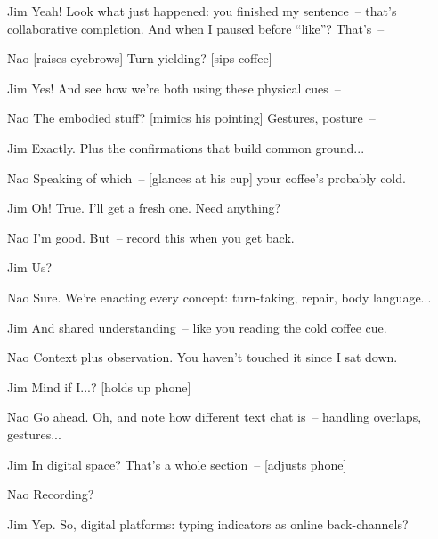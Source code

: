 \begin{sloppypar}
\begin{dialogue}
\item[Jim] Yeah! Look what just happened: you finished my sentence~-- that's collaborative completion. And when I paused before ``like''? That's~-- 

\item[Nao] [raises eyebrows] Turn-yielding? [sips coffee]

\item[Jim] Yes! And see how we're both using these physical cues~-- 

\item[Nao] The embodied stuff? [mimics his pointing] Gestures, posture~-- 

\item[Jim] Exactly. Plus the confirmations that build common ground...

\item[Nao] Speaking of which~-- [glances at his cup] your coffee's probably cold.

\item[Jim] Oh! True. I'll get a fresh one. Need anything?

\item[Nao] I'm good. But~-- record this when you get back.

\item[Jim] Us?

\item[Nao] Sure. We're enacting every concept: turn-taking, repair, body language...

\item[Jim] And shared understanding~-- like you reading the cold coffee cue.

\item[Nao] Context plus observation. You haven't touched it since I sat down.

\item[Jim] Mind if I...? [holds up phone]

\item[Nao] Go ahead. Oh, and note how different text chat is~-- handling overlaps, gestures...

\item[Jim] In digital space? That's a whole section~-- [adjusts phone]

\item[Nao] Recording?

\item[Jim] Yep. So, digital platforms: typing indicators as online back-channels?


\end{dialogue}
\end{sloppypar}
